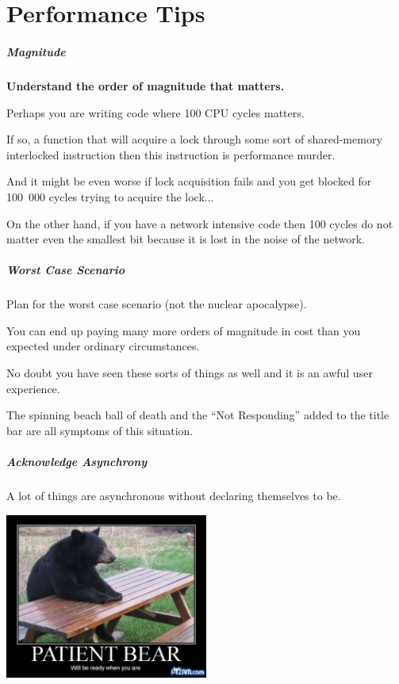 \part{Performance Tips}

\begin{frame}
\partpage
\end{frame}



\begin{frame}
\frametitle{Magnitude}

\textbf{Understand the order of magnitude that matters.} 

Perhaps you are writing code where 100 CPU cycles matters. 

If so, a function that will acquire a lock through some sort of shared-memory interlocked instruction then this instruction is performance murder. 

And it might be even worse if lock acquisition fails and you get blocked for 100~000 cycles trying to acquire the lock... 

On the other hand, if you have a network intensive code then 100 cycles do not matter even the smallest bit because it is lost in the noise of the network.

\end{frame}



\begin{frame}
\frametitle{Worst Case Scenario}

Plan for the worst case scenario (not the nuclear apocalypse).

You can end up paying many more orders of magnitude in cost than you expected under ordinary circumstances.

No doubt you have seen these sorts of things as well and it is an awful user experience. 

The spinning beach ball of death and the ``Not Responding'' added to the title bar are all symptoms of this situation. 


\end{frame}



\begin{frame}
\frametitle{Acknowledge Asynchrony}

A lot of things are asynchronous without declaring themselves to be.

\begin{center}
	\includegraphics[width=0.5\textwidth]{images/patientbear.jpg}
\end{center}

\end{frame}



